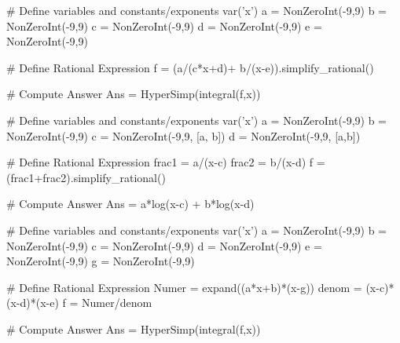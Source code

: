 \begin{sagesilent}
# Define variables and constants/exponents
var('x')
a = NonZeroInt(-9,9)
b = NonZeroInt(-9,9)
c = NonZeroInt(-9,9)
d = NonZeroInt(-9,9)
e = NonZeroInt(-9,9)


# Define Rational Expression
f = (a/(c*x+d)+ b/(x-e)).simplify_rational()

# Compute Answer
Ans = HyperSimp(integral(f,x))
\end{sagesilent}




\begin{sagesilent}
# Define variables and constants/exponents
var('x')
a = NonZeroInt(-9,9)
b = NonZeroInt(-9,9)
c = NonZeroInt(-9,9, [a, b])
d = NonZeroInt(-9,9, [a,b])


# Define Rational Expression
frac1 = a/(x-c)
frac2 = b/(x-d)
f = (frac1+frac2).simplify_rational()

# Compute Answer
Ans = a*log(x-c) + b*log(x-d)
\end{sagesilent}



\begin{sagesilent}
# Define variables and constants/exponents
var('x')
a = NonZeroInt(-9,9)
b = NonZeroInt(-9,9)
c = NonZeroInt(-9,9)
d = NonZeroInt(-9,9)
e = NonZeroInt(-9,9)
g = NonZeroInt(-9,9)


# Define Rational Expression
Numer = expand((a*x+b)*(x-g))
denom = (x-c)*(x-d)*(x-e)
f = Numer/denom

# Compute Answer
Ans = HyperSimp(integral(f,x))
\end{sagesilent}

